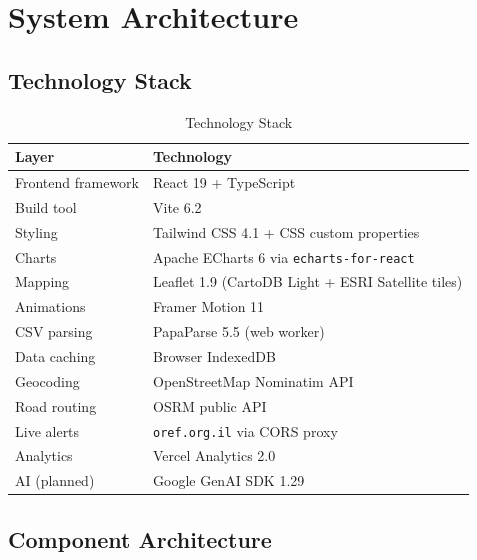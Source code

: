 \documentclass[12pt,a4paper]{article}
\begin{document}
\section{System Architecture}
\label{sec:architecture}

\subsection{Technology Stack}

\begin{table}[H]\centering
\caption{Technology Stack}
\label{tab:stack}
\begin{tabular}{ll}\toprule
\textbf{Layer} & \textbf{Technology} \\\midrule
Frontend framework & React 19 + TypeScript \\
Build tool         & Vite 6.2 \\
Styling            & Tailwind CSS 4.1 + CSS custom properties \\
Charts             & Apache ECharts 6 via \texttt{echarts-for-react} \\
Mapping            & Leaflet 1.9 (CartoDB Light + ESRI Satellite tiles) \\
Animations         & Framer Motion 11 \\
CSV parsing        & PapaParse 5.5 (web worker) \\
Data caching       & Browser IndexedDB \\
Geocoding          & OpenStreetMap Nominatim API \\
Road routing       & OSRM public API \\
Live alerts        & \texttt{oref.org.il} via CORS proxy \\
Analytics          & Vercel Analytics 2.0 \\
AI (planned)       & Google GenAI SDK 1.29 \\\bottomrule
\end{tabular}
\end{table}

\subsection{Component Architecture}
\end{document}
